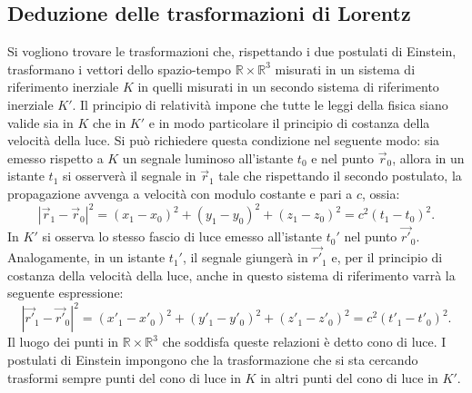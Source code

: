 \subsection{Deduzione delle trasformazioni di Lorentz}
\label{sec:DervTrasfLorentz}
Si vogliono trovare le trasformazioni che, rispettando i due postulati di Einstein, trasformano i vettori dello spazio-tempo $\mathbb{R}\times\mathbb{R}^3$  misurati in un sistema di riferimento inerziale $K$ in quelli misurati in un secondo sistema di riferimento inerziale $K'$. Il principio di relatività impone che tutte le leggi della fisica siano valide sia in $K$ che in $K'$ e in modo particolare il principio di costanza della velocità della luce. Si può richiedere questa condizione nel seguente modo: sia emesso rispetto a $K$ un segnale luminoso all'istante $t_0$ e nel punto $\vec{r}_0$, allora in un istante $t_1$ si osserverà il segnale in $\vec{r}_1$ tale che rispettando il secondo postulato, la propagazione avvenga a velocità con modulo costante e pari a $c$, ossia:
\begin{equation}
    |\vec{r}_1-\vec{r}_0|^2=(x_1-x_0)^2+(y_1-y_0)^2+(z_1-z_0)^2=c^2(t_1-t_0)^2.
    \label{luceK}
\end{equation}
In $K'$ si osserva lo stesso fascio di luce emesso all'istante $t_0'$ nel punto $\vec{r'}_0$. Analogamente, in un istante $t_1'$, il segnale giungerà in $\vec{r'}_1$ e, per il principio di costanza della velocità della luce, anche in questo sistema di riferimento varrà la seguente espressione:
\begin{equation}
    |\vec{r'}_1-\vec{r'}_0|^2=(x'_1-x'_0)^2+(y'_1-y'_0)^2+(z'_1-z'_0)^2=c^2(t'_1-t'_0)^2.
    \label{luceK'}
\end{equation}
Il luogo dei punti in $\mathbb{R}\times\mathbb{R}^3$ che soddisfa queste relazioni è detto cono di luce. I postulati di Einstein impongono che la trasformazione che si sta cercando trasformi sempre punti del cono di luce in $K$ in altri punti del cono di luce in $K'$.\\ 

